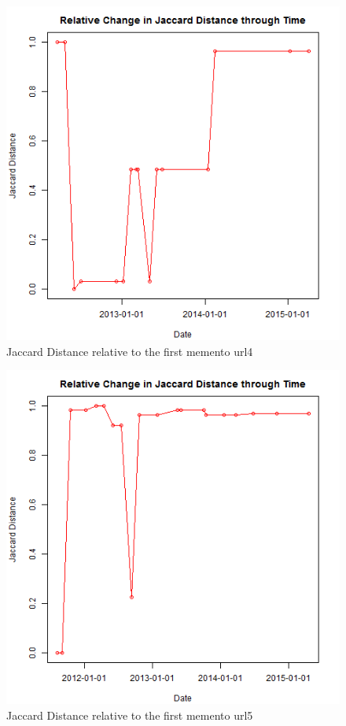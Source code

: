 \begin{figure}[ht]
	\begin{center}
		 \includegraphics[scale=0.60]{url4}
		  \caption{Jaccard Distance relative to the first memento url4}
	 \end{center}
\end{figure}
\begin{figure}[ht]
	\begin{center}
		 \includegraphics[scale=0.60]{url5}
		  \caption{Jaccard Distance relative to the first memento url5}
	 \end{center}
\end{figure}
